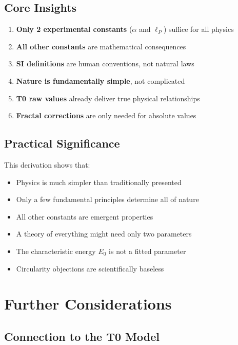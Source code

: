 \documentclass[12pt,a4paper]{article}
\theoremstyle{definition}
\begin{document}
	\subsection{Core Insights}
	
	\begin{tcolorbox}[colback=yellow!10!white,colframe=orange!75!black,title=Revolutionary Simplicity]
		\begin{enumerate}
			\item \textbf{Only 2 experimental constants} ($\alpha$ and $\ell_P$) suffice for all physics
			\item \textbf{All other constants} are mathematical consequences
			\item \textbf{SI definitions} are human conventions, not natural laws
			\item \textbf{Nature is fundamentally simple}, not complicated
			\item \textbf{T0 raw values} already deliver true physical relationships
			\item \textbf{Fractal corrections} are only needed for absolute values
		\end{enumerate}
	\end{tcolorbox}
	
	\subsection{Practical Significance}
	
	This derivation shows that:
	
	\begin{itemize}
		\item Physics is much simpler than traditionally presented
		\item Only a few fundamental principles determine all of nature
		\item All other constants are emergent properties
		\item A theory of everything might need only two parameters
		\item The characteristic energy $E_0$ is not a fitted parameter
		\item Circularity objections are scientifically baseless
	\end{itemize}
	
	\section{Further Considerations}
	
	\subsection{Connection to the T0 Model}
	
\end{document}
